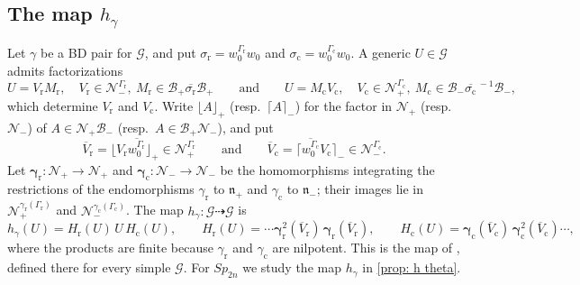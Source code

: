 \documentclass[a4paper]{amsart}
\numberwithin{equation}{section}
\theoremstyle{definition}
\theoremstyle{remark}
\newcommand{\mfn}{\mathfrak{n}}
\newcommand{\mcG}{\mathcal{G}}
\newcommand{\mcN}{\mathcal{N}}
\newcommand{\mcB}{\mathcal{B}}
\newcommand{\rr}{\mathrm{r}}
\newcommand{\cc}{\mathrm{c}}
\newcommand{\Sp}{Sp_{2n}}
\begin{document}
\subsection{The map \texorpdfstring{$h_\gamma$}{h}}
\label{sec: h}
Let $\gamma$ be a BD pair for $\mcG$, and put $\sigma_{\rr}=w_0^{\Gamma_{\rr}}w_0$ and $\sigma_{\cc}=w_0^{\Gamma_{\cc}}w_0$.
A generic $U\in\mcG$ admits factorizations
\begin{equation*}
  U=V_{\rr}M_{\rr},\quad V_{\rr}\in\mcN_-^{\Gamma_{\rr}},\ M_{\rr}\in\mcB_+\overline{\sigma_{\rr}}\mcB_+
  \qquad\text{and}\qquad
  U=M_{\cc}V_{\cc},\quad V_{\cc}\in\mcN_+^{\Gamma_{\cc}},\ M_{\cc}\in\mcB_-\overline{\sigma_{\cc}}^{\,-1}\mcB_-,
\end{equation*}
which determine $V_{\rr}$ and $V_{\cc}$.
Write $\lfloor A\rfloor_+$ (resp.\ $\lceil A\rceil_-$) for the factor in $\mcN_+$ (resp.\ $\mcN_-$) of $A\in\mcN_+\mcB_-$ (resp.~$A\in\mcB_+\mcN_-$), and put
\begin{equation*}
  \overline{V}_{\rr}=\lfloor V_{\rr}\overline{w_0^{\Gamma_{\rr}}}\rfloor_+\in\mcN_+^{\Gamma_{\rr}}
  \qquad\text{and}\qquad
  \overline{V}_{\cc}=\lceil \overline{w_0^{\Gamma_{\cc}}}V_{\cc}\rceil_-\in\mcN_-^{\Gamma_{\cc}}.
\end{equation*}
Let $\boldsymbol\gamma_{\rr}:\mcN_+\to\mcN_+$ and $\boldsymbol\gamma_{\cc}:\mcN_-\to\mcN_-$ be the homomorphisms integrating the restrictions of the endomorphisms $\gamma_{\rr}$ to $\mfn_+$ and $\gamma_{\cc}$ to $\mfn_-$; their images lie in $\mcN_+^{\gamma_{\rr}(\Gamma_{\rr})}$ and $\mcN_-^{\gamma_{\cc}(\Gamma_{\cc})}$.
The map $h_\gamma:\mcG\dashrightarrow\mcG$ is
\begin{equation}
  \label{eq: h}
  h_\gamma(U)=H_{\rr}(U)\,U\,H_{\cc}(U),
  \qquad
  H_{\rr}(U)=\cdots\boldsymbol\gamma_{\rr}^2(\overline{V}_{\rr})\,\boldsymbol\gamma_{\rr}(\overline{V}_{\rr}),
  \qquad
  H_{\cc}(U)=\boldsymbol\gamma_{\cc}(\overline{V}_{\cc})\,\boldsymbol\gamma_{\cc}^2(\overline{V}_{\cc})\cdots,
\end{equation}
where the products are finite because $\gamma_{\rr}$ and $\gamma_{\cc}$ are nilpotent.
This is the map of \cite[Section~3.1]{GSV23}, defined there for every simple $\mcG$.
For $\Sp$ we study the map $h_\gamma$ in \cref{prop: h theta}.
\end{document}
